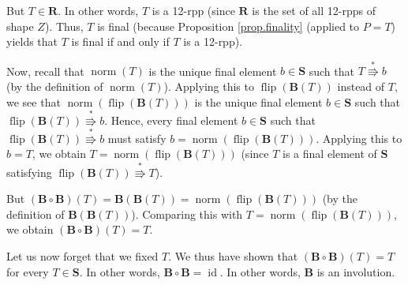 \documentclass[numbers=enddot,12pt,final,onecolumn,notitlepage]{scrartcl}%
\theoremstyle{definition}
\begin{document}
But $T\in\mathbf{R}$. In other words, $T$ is a 12-rpp (since $\mathbf{R}$ is
the set of all 12-rpps of shape $Z$). Thus, $T$ is final (because Proposition
\ref{prop.finality} (applied to $P=T$) yields that $T$ is final if and only if
$T$ is a 12-rpp).

Now, recall that $\operatorname*{norm}\left(  T\right)  $ is the unique final
element $b\in\mathbf{S}$ such that $T\overset{\ast}{\Rrightarrow}b$ (by the
definition of $\operatorname*{norm}\left(  T\right)  $). Applying this to
$\operatorname*{flip}\left(  \mathbf{B}\left(  T\right)  \right)  $ instead of
$T$, we see that $\operatorname*{norm}\left(  \operatorname*{flip}\left(
\mathbf{B}\left(  T\right)  \right)  \right)  $ is the unique final element
$b\in\mathbf{S}$ such that $\operatorname*{flip}\left(  \mathbf{B}\left(
T\right)  \right)  \overset{\ast}{\Rrightarrow}b$. Hence, every final element
$b\in\mathbf{S}$ such that $\operatorname*{flip}\left(  \mathbf{B}\left(
T\right)  \right)  \overset{\ast}{\Rrightarrow}b$ must satisfy
$b=\operatorname*{norm}\left(  \operatorname*{flip}\left(  \mathbf{B}\left(
T\right)  \right)  \right)  $. Applying this to $b=T$, we obtain
$T=\operatorname*{norm}\left(  \operatorname*{flip}\left(  \mathbf{B}\left(
T\right)  \right)  \right)  $ (since $T$ is a final element of $\mathbf{S}$
satisfying $\operatorname*{flip}\left(  \mathbf{B}\left(  T\right)  \right)
\overset{\ast}{\Rrightarrow}T$).

But $\left(  \mathbf{B}\circ\mathbf{B}\right)  \left(  T\right)
=\mathbf{B}\left(  \mathbf{B}\left(  T\right)  \right)  =\operatorname*{norm}%
\left(  \operatorname*{flip}\left(  \mathbf{B}\left(  T\right)  \right)
\right)  $ (by the definition of $\mathbf{B}\left(  \mathbf{B}\left(
T\right)  \right)  $). Comparing this with $T=\operatorname*{norm}\left(
\operatorname*{flip}\left(  \mathbf{B}\left(  T\right)  \right)  \right)  $,
we obtain $\left(  \mathbf{B}\circ\mathbf{B}\right)  \left(  T\right)  =T$.

Let us now forget that we fixed $T$. We thus have shown that $\left(
\mathbf{B}\circ\mathbf{B}\right)  \left(  T\right)  =T$ for every
$T\in\mathbf{S}$. In other words, $\mathbf{B}\circ\mathbf{B}%
=\operatorname*{id}$. In other words, $\mathbf{B}$ is an involution.
\end{document}
